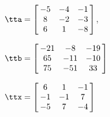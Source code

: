 {$\tta = \left[\hskip -3pt \begin{array}{ccc} -5&-4&-1 \\    8&-2&-3 \\    6&1&-8\end{array}\hskip -3pt \right] $, 

$\ttb=\left[\hskip -3pt \begin{array}{ccc} -21&-8&-19\\    65&-11&-10 \\    75 & -51&33  \end{array}\hskip -3pt \right] $}
{$\ttx=\left[\hskip -3pt \begin{array}{ccc} 6&1&-1\\    -1&-1&7 \\    -5&7&-4  \end{array}\hskip -3pt \right] $}
